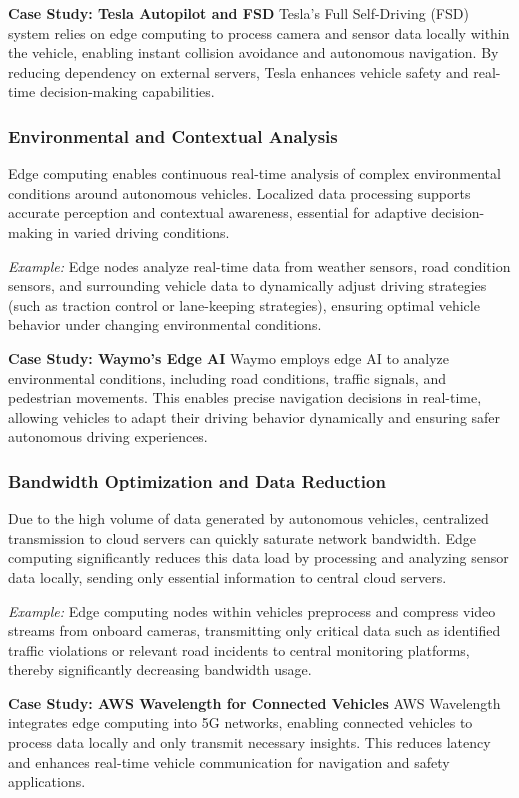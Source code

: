 \documentclass[runningheads]{llncs}
\begin{document}
\noindent\textbf{Case Study: Tesla Autopilot and FSD}
Tesla’s Full Self-Driving (FSD) system relies on edge computing to process camera and sensor data locally within the vehicle, enabling instant collision avoidance and autonomous navigation. By reducing dependency on external servers, Tesla enhances vehicle safety and real-time decision-making capabilities.

\subsubsection{Environmental and Contextual Analysis}
Edge computing enables continuous real-time analysis of complex environmental conditions around autonomous vehicles. Localized data processing supports accurate perception and contextual awareness, essential for adaptive decision-making in varied driving conditions.

\noindent\textit{Example:} Edge nodes analyze real-time data from weather sensors, road condition sensors, and surrounding vehicle data to dynamically adjust driving strategies (such as traction control or lane-keeping strategies), ensuring optimal vehicle behavior under changing environmental conditions.

\noindent\textbf{Case Study: Waymo's Edge AI}
Waymo employs edge AI to analyze environmental conditions, including road conditions, traffic signals, and pedestrian movements. This enables precise navigation decisions in real-time, allowing vehicles to adapt their driving behavior dynamically and ensuring safer autonomous driving experiences.
\subsubsection{Bandwidth Optimization and Data Reduction}
Due to the high volume of data generated by autonomous vehicles, centralized transmission to cloud servers can quickly saturate network bandwidth. Edge computing significantly reduces this data load by processing and analyzing sensor data locally, sending only essential information to central cloud servers.

\noindent\textit{Example:} Edge computing nodes within vehicles preprocess and compress video streams from onboard cameras, transmitting only critical data such as identified traffic violations or relevant road incidents to central monitoring platforms, thereby significantly decreasing bandwidth usage.

\noindent\textbf{Case Study: AWS Wavelength for Connected Vehicles}
AWS Wavelength integrates edge computing into 5G networks, enabling connected vehicles to process data locally and only transmit necessary insights. This reduces latency and enhances real-time vehicle communication for navigation and safety applications.
\end{document}
